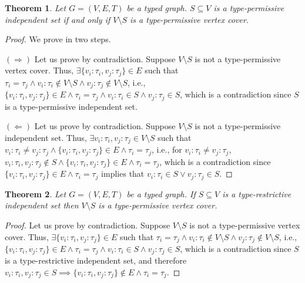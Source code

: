 \documentclass[preprint,12pt]{elsarticle}
\theoremstyle{plain}
\newtheorem{theorem}{Theorem}[section]
\newcommand\tyv[2]{#1\!\!:\!\!#2}
\begin{document}
\begin{theorem}
Let $G = (V,E,T)$ be a typed graph.
$S\subseteq V$
is a type-permissive independent set
if and only if
$V\setminus S$
is a type-permissive vertex cover.
\end{theorem}
\begin{proof}
We prove in two steps.

$(\Longrightarrow)$
Let us prove by contradiction.
Suppose $V\setminus S$ is not a 
type-permissive vertex cover.
Thus,
$\exists \{\tyv{v_i}{\tau_i},\tyv{v_j}{\tau_j}\}\in E$
such that
$\tau_i=\tau_j \wedge \tyv{v_i}{\tau_i}\notin V\setminus S \wedge \tyv{v_j}{\tau_j} \notin V\setminus S$,
i.e.,
$\{\tyv{v_i}{\tau_i},\tyv{v_j}{\tau_j}\}\in E \wedge \tau_i=\tau_j \wedge \tyv{v_i}{\tau_i}\in S \wedge \tyv{v_j}{\tau_j} \in S$,
which is a contradiction
since $S$ is a type-permissive independent set.

$(\Longleftarrow)$
Let us prove by contradiction.
Suppose $V\setminus S$ is not a 
type-permissive independent set.
Thus,
$\exists \tyv{v_i}{\tau_i},\tyv{v_j}{\tau_j}\in V\setminus S$
such that
$\tyv{v_i}{\tau_i}\neq\tyv{v_j}{\tau_j} \wedge \{\tyv{v_i}{\tau_i},\tyv{v_j}{\tau_j}\}\in E
 \wedge \tau_i=\tau_j$,
i.e.,
for $\tyv{v_i}{\tau_i}\neq\tyv{v_j}{\tau_j}$,
$\tyv{v_i}{\tau_i},\tyv{v_j}{\tau_j}\notin S \wedge \{\tyv{v_i}{\tau_i},\tyv{v_j}{\tau_j}\}\in E
 \wedge \tau_i=\tau_j$,
which is a contradiction
since $\{\tyv{v_i}{\tau_i},\tyv{v_j}{\tau_j}\}\in E
 \wedge \tau_i=\tau_j$ implies that $\tyv{v_i}{\tau_i}\in S \vee \tyv{v_j}{\tau_j}\in S$.
\end{proof}

\begin{theorem}
Let $G = (V,E,T)$ be a typed graph.
If
$S\subseteq V$
is a type-restrictive independent set
then
$V\setminus S$
is a type-permissive vertex cover.
\end{theorem}
\begin{proof}
Let us prove by contradiction.
Suppose $V\setminus S$ is not a 
type-permissive vertex cover.
Thus,
$\exists \{\tyv{v_i}{\tau_i},\tyv{v_j}{\tau_j}\}\in E$
such that
$\tau_i=\tau_j \wedge \tyv{v_i}{\tau_i}\notin V\setminus S \wedge \tyv{v_j}{\tau_j} \notin V\setminus S$,
i.e.,
$\{\tyv{v_i}{\tau_i},\tyv{v_j}{\tau_j}\}\in E \wedge \tau_i=\tau_j \wedge \tyv{v_i}{\tau_i}\in S \wedge \tyv{v_j}{\tau_j} \in S$,
which is a contradiction
since $S$ is a type-restrictive independent set,
and therefore $\tyv{v_i}{\tau_i},\tyv{v_j}{\tau_j}\in S \implies \{\tyv{v_i}{\tau_i},\tyv{v_j}{\tau_j}\}\notin E \wedge \tau_i=\tau_j$.
\end{proof}
\end{document}

